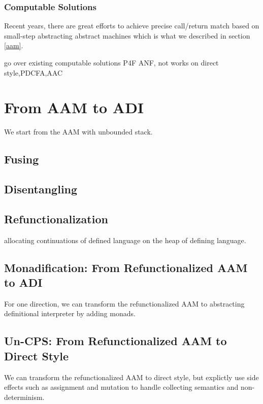 \documentclass[acmsmall,review,anonymous]{acmart}\settopmatter{printfolios=true,printccs=false,printacmref=false}
\begin{document}
\subsubsection{Computable Solutions}

Recent years, there are great efforts \cite{vardoulakis2010cfa2, earl2012introspective, gilray2016pushdown}
to achieve precise call/return match based
on small-step abstracting abstract machines which is what we described in section \ref{aam}.

go over existing computable solutions P4F ANF, not works on direct style,PDCFA,AAC

\section{From AAM to ADI}

We start from the AAM with unbounded stack.

\subsection{Fusing}

\subsection{Disentangling}

\subsection{Refunctionalization}

allocating continuations of defined language on the heap of defining language.


\subsection{Monadification: From Refunctionalized AAM to ADI}

For one direction, we can transform the refunctionalized AAM to abstracting definitional interpreter
by adding monads.

\subsection{Un-CPS: From Refunctionalized AAM to Direct Style}

We can transform the refunctionalized AAM to direct style, but explictly use 
side effects such as assignment and mutation to handle collecting semantics and non-determinism.
\end{document}
